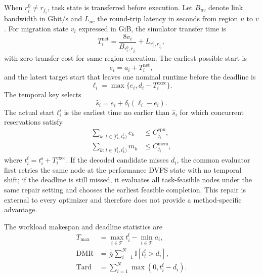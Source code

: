 When $r_i^0\neq r_{j_i}$, task state is transferred before execution. Let $B_{uv}$ denote link bandwidth in Gbit/s and $L_{uv}$ the round-trip latency in seconds from region $u$ to $v$. For migration state $v_i$ expressed in GiB, the simulator transfer time is
\begin{equation}
T^{\mathrm{net}}_i=\frac{8v_i}{B_{r_i^0,r_{j_i}}}+L_{r_i^0,r_{j_i}},
\label{eq:transfer-time}
\end{equation}
with zero transfer cost for same-region execution. The earliest possible start is
\begin{equation}
e_i=a_i+T^{\mathrm{net}}_i,
\end{equation}
and the latest target start that leaves one nominal runtime before the deadline is
\begin{equation}
\ell_i=\max\{e_i,d_i-T^{\mathrm{exec}}_i\}.
\end{equation}
The temporal key selects
\begin{equation}
\hat{s}_i=e_i+\delta_i(\ell_i-e_i).
\label{eq:temporal-target}
\end{equation}
The actual start $t_i^{\mathrm{s}}$ is the earliest time no earlier than $\hat{s}_i$ for which concurrent reservations satisfy
\begin{align}
\sum_{k:\,t\in[t_k^{\mathrm{s}},t_k^{\mathrm{f}})} c_k &\le C^{\mathrm{cpu}}_{j_i}, \\
\sum_{k:\,t\in[t_k^{\mathrm{s}},t_k^{\mathrm{f}})} m_k &\le C^{\mathrm{mem}}_{j_i},
\label{eq:resource-capacity}
\end{align}
where $t_i^{\mathrm{f}}=t_i^{\mathrm{s}}+T^{\mathrm{exec}}_i$. If the decoded candidate misses $d_i$, the common evaluator first retries the same node at the performance DVFS state with no temporal shift; if the deadline is still missed, it evaluates all task-feasible nodes under the same repair setting and chooses the earliest feasible completion. This repair is external to every optimizer and therefore does not provide a method-specific advantage.

The workload makespan and deadline statistics are
\begin{align}
T_{\max} &= \max_{i\in\mathcal{T}} t_i^{\mathrm{f}}-\min_{i\in\mathcal{T}} a_i, \\
\mathrm{DMR} &= \frac{1}{N}\sum_{i=1}^{N}\mathbb{I}[t_i^{\mathrm{f}}>d_i], \\
\mathrm{Tard} &= \sum_{i=1}^{N}\max(0,t_i^{\mathrm{f}}-d_i).
\label{eq:latency-metrics}
\end{align}

